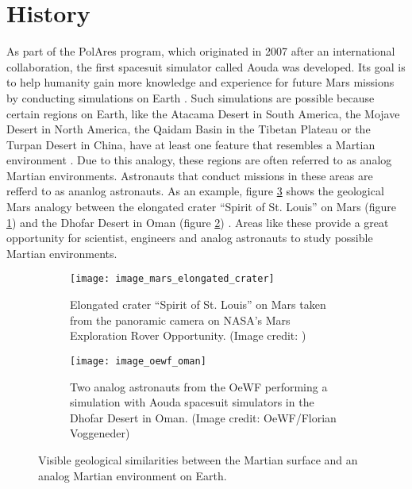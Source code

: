 \section{History}
As part of the PolAres program, which originated in 2007 after an international collaboration, the first spacesuit simulator called Aouda was developed. Its goal is to help humanity gain more knowledge and experience for future Mars missions by conducting simulations on Earth \cite{OeWF:2019_history}. Such simulations are possible because certain regions on Earth, like the Atacama Desert in South America, the Mojave Desert in North America, the Qaidam Basin in the Tibetan Plateau or the Turpan Desert in China, have at least one feature that resembles a Martian environment \cite{Salas:2011, Preston:2012, Preston:2014}. Due to this analogy, these regions are often referred to as analog Martian environments. Astronauts that conduct missions in these areas are refferd to as ananlog astronauts. As an example, figure \ref{fig:analogy_mars_oman} shows the geological Mars analogy between the elongated crater ``Spirit of St. Louis'' on Mars (figure \ref{fig:image_mars_elongated_crater}) and the Dhofar Desert in Oman (figure \ref{fig:image_oewf_oman}) \cite{Greicius:2015}. Areas like these provide a great opportunity for scientist, engineers and analog astronauts to study possible Martian environments. 
\vfill
\begin{figure}[h!]
	\centering
	\begin{subfigure}[b]{0.96\textwidth}	%
		\centering
		\texttt{[image: image\_mars\_elongated\_crater]}
		\caption{Elongated crater ``Spirit of St. Louis'' on Mars taken from the panoramic camera on NASA's Mars Exploration Rover Opportunity. (Image credit: \cite{Greicius:2015})}
		\label{fig:image_mars_elongated_crater}
	\end{subfigure}
	
	\hfill
	
	\begin{subfigure}[b]{0.96\textwidth}	%
		\centering
		\texttt{[image: image\_oewf\_oman]}
		\caption{Two analog astronauts from the OeWF performing a simulation with Aouda spacesuit simulators in the Dhofar Desert in Oman. (Image credit: OeWF/Florian Voggeneder)}
		\label{fig:image_oewf_oman}
	\end{subfigure}
	\caption{Visible geological similarities between the Martian surface and an analog Martian environment on Earth.}
	\label{fig:analogy_mars_oman}
\end{figure}
\vfill

